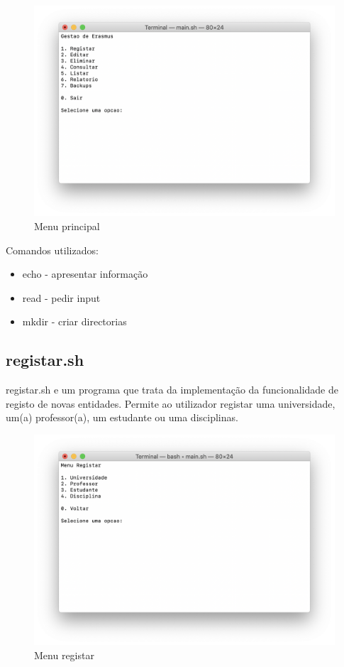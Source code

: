 \documentclass{article}
\begin{document}
\begin{figure}[h]
\centering
\includegraphics[scale=0.4]{images/MainMenu}
\caption{Menu principal}
\end{figure}

Comandos utilizados:

\begin{itemize}
\item echo - apresentar informação
\item read - pedir input
\item mkdir - criar directorias
\end{itemize}

\pagebreak{}
\subsection{registar.sh}
\label{sec:org3ac8dd4}

registar.sh e um programa que trata da implementação da funcionalidade de registo de novas entidades.
Permite ao utilizador registar uma universidade, um(a) professor(a), um estudante ou uma disciplinas.

\begin{figure}[h]
\centering
\includegraphics[scale=0.4]{images/MenuRegistar}
\caption{Menu registar}
\end{figure}
\end{document}

